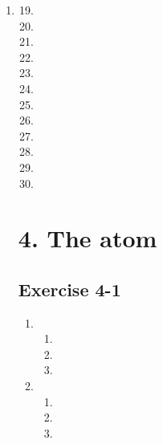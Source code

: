 \begin{enumerate}[label=\textbf{\arabic*}., itemsep=5pt]
\item %
\begin{multicols}{2}
\begin{enumerate}[label=\textbf{(\alph*)}, itemsep=7pt]
\setcounter{enumi}{18}
\item %
\item %
\item %
\item %
\item %
\item %
\item %
\item %
\item %
\item %
\item %
\item %
\end{enumerate}
\end{multicols}



\section {4. The atom}
\subsection{Exercise 4-1} %

\begin{enumerate}[noitemsep, label=\textbf{\arabic*}. ] 
\item %

  \begin{enumerate} [noitemsep, label=\textbf{(\alph*)} ]
  \item %
  \item %
  \item %
  \end{enumerate}
 \item %
  \begin{enumerate} [noitemsep, label=\textbf{(\alph*)} ]
  \item %
  \item %
  \item %
  \end{enumerate}
     

\end{enumerate}
\end{enumerate}
